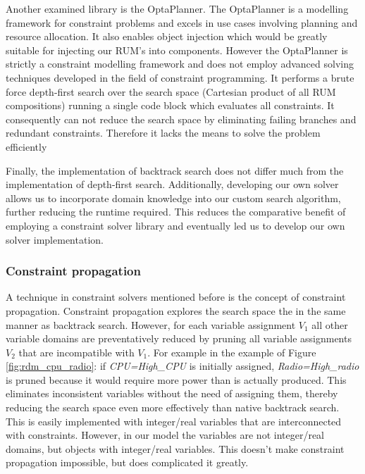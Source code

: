 Another examined library is the OptaPlanner. The OptaPlanner is a modelling framework for constraint problems and excels in use cases involving planning and resource allocation. It also enables object injection which would be greatly suitable for injecting our RUM's into components. However the OptaPlanner is strictly a constraint modelling framework and does not employ advanced solving techniques developed in the field of constraint programming. It performs a brute force depth-first search over the search space (Cartesian product of all RUM compositions) running a single code block which evaluates all constraints. It consequently can not reduce the search space by eliminating failing branches and redundant constraints. Therefore it lacks the means to solve the problem efficiently

Finally, the implementation of backtrack search does not differ much from the implementation of depth-first search. Additionally, developing our own solver allows us to incorporate domain knowledge into our custom search algorithm, further reducing the runtime required. This reduces the comparative benefit of employing a constraint solver library and eventually led us to develop our own solver implementation.

\subsubsection{Constraint propagation}
A technique in constraint solvers mentioned before is the concept of constraint propagation. Constraint propagation explores the search space the in the same manner as backtrack search. However, for each variable assignment $V_1$ all other variable domains are preventatively reduced by pruning all variable assignments $V_2$ that are incompatible with $V_1$. For example in the example of Figure \ref{fig:rdm_cpu_radio}: if \emph{CPU=High\_CPU} is initially assigned, \emph{Radio=High\_radio} is pruned because it would require more power than is actually produced. This eliminates inconsistent variables without the need of assigning them, thereby reducing the search space even more effectively than native backtrack search. This is easily implemented with integer/real variables that are interconnected with constraints. However, in our model the variables are not integer/real domains, but objects with integer/real variables. This doesn't make constraint propagation impossible, but does complicated it greatly.

